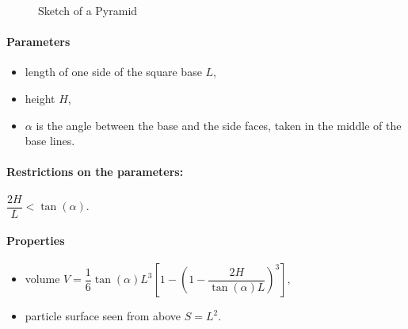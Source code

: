 \begin{figure}[ht]
\hfill
{}
\hfill
{}
\hfill
\caption{Sketch of a Pyramid}
\label{fig:pyramid}
\end{figure}

\FloatBarrier

\paragraph{Parameters}
\begin{itemize}
\item length of one side of the square base $L$,  
\item height $H$,
\item  $\alpha$ is the angle between the base and the
  side faces, taken in the middle of the base lines.
\end{itemize}

\paragraph{Restrictions on the parameters:}  $\dfrac{2H}{L} < \tan(\alpha)$.

\paragraph{Properties}
\begin{itemize}
\item  volume $V = \dfrac{1}{6} \tan(\alpha) L^3\left[ 1
             - \left(1 - \dfrac{2H}{\tan(\alpha)L}\right)^3 \right],$
\item particle surface seen from above $S = L^2$.
\end{itemize}

